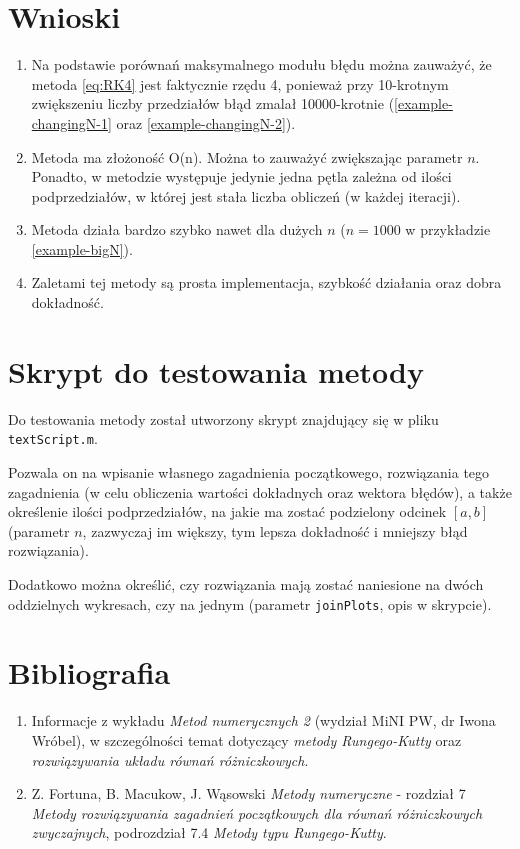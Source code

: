 \documentclass[12pt]{article}
\begin{document}
	\section{Wnioski}
	\begin{enumerate}
		\item
		Na podstawie porównań maksymalnego modułu błędu można zauważyć, że metoda \eqref{eq:RK4} jest faktycznie rzędu 4, ponieważ przy 10-krotnym zwiększeniu liczby przedziałów błąd zmalał 10000-krotnie (\ref{example-changingN-1} oraz \ref{example-changingN-2}).
		
		\item
		Metoda ma złożoność O(n). Można to zauważyć zwiększając parametr $n$. Ponadto, w metodzie występuje jedynie jedna pętla zależna od ilości podprzedziałów, w której jest stała liczba obliczeń (w każdej iteracji).
		
		\item
		Metoda działa bardzo szybko nawet dla dużych $n$ ($n = 1000$ w przykładzie \ref{example-bigN}).
		
		\item
		Zaletami tej metody są prosta implementacja, szybkość działania oraz dobra dokładność.
	\end{enumerate}
	
	
	
	\section{Skrypt do testowania metody}
	\label{sec:testing-script}
	Do testowania metody został utworzony skrypt znajdujący się w pliku \texttt{textScript.m}.
	
	Pozwala on na wpisanie własnego zagadnienia początkowego, rozwiązania tego zagadnienia (w celu obliczenia wartości dokładnych oraz wektora błędów), a także określenie ilości podprzedziałów, na jakie ma zostać podzielony odcinek $[a, b]$ (parametr $n$, zazwyczaj im większy, tym lepsza dokładność i mniejszy błąd rozwiązania).
	
	Dodatkowo można określić, czy rozwiązania mają zostać naniesione na dwóch oddzielnych wykresach, czy na jednym (parametr \texttt{joinPlots}, opis w skrypcie).
	
	
	\section{Bibliografia}
	\begin{enumerate}
		\item Informacje z wykładu \textit{Metod numerycznych 2} (wydział MiNI PW, dr Iwona Wróbel), w szczególności temat dotyczący \textit{metody Rungego-Kutty} oraz \textit{rozwiązywania układu równań różniczkowych}.
		\item Z. Fortuna, B. Macukow, J. Wąsowski \textit{Metody numeryczne} - rozdział 7 \textit{Metody rozwiązywania zagadnień początkowych dla równań różniczkowych zwyczajnych}, podrozdział 7.4 \textit{Metody typu Rungego-Kutty}.
	\end{enumerate}
	
\end{document}
